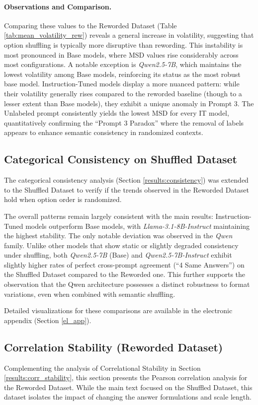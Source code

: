 \paragraph{Observations and Comparison.}
Comparing these values to the Reworded Dataset (Table \ref{tab:mean_volatility_rew}) reveals a general increase in volatility, suggesting that option shuffling is typically more disruptive than rewording. This instability is most pronounced in Base models, where MSD values rise considerably across most configurations. A notable exception is \textit{Qwen2.5-7B}, which maintains the lowest volatility among Base models, reinforcing its status as the most robust base model. Instruction-Tuned models display a more nuanced pattern: while their volatility generally rises compared to the reworded baseline (though to a lesser extent than Base models), they exhibit a unique anomaly in Prompt 3. The Unlabeled prompt consistently yields the lowest MSD for every IT model, quantitatively confirming the ``Prompt 3 Paradox'' where the removal of labels appears to enhance semantic consistency in randomized contexts.


\subsection{Categorical Consistency on Shuffled Dataset}
\label{app:consistency_shuffled}
The categorical consistency analysis (Section \ref{results:consistency}) was extended to the Shuffled Dataset to verify if the trends observed in the Reworded Dataset hold when option order is randomized.

The overall patterns remain largely consistent with the main results: Instruction-Tuned models outperform Base models, with \textit{Llama-3.1-8B-Instruct} maintaining the highest stability. The only notable deviation was observed in the \textit{Qwen} family. Unlike other models that show static or slightly degraded consistency under shuffling, both \textit{Qwen2.5-7B} (Base) and \textit{Qwen2.5-7B-Instruct} exhibit slightly higher rates of perfect cross-prompt agreement (``4 Same Answers'') on the Shuffled Dataset compared to the Reworded one. This further supports the observation that the Qwen architecture possesses a distinct robustness to format variations, even when combined with semantic shuffling.

Detailed visualizations for these comparisons are available in the electronic appendix (Section \ref{el_app}).


\subsection{Correlation Stability (Reworded Dataset)}
\label{app:corr_reworded}
Complementing the analysis of Correlational Stability in Section \ref{results:corr_stability}, this section presents the Pearson correlation analysis for the Reworded Dataset. While the main text focused on the Shuffled Dataset, this dataset isolates the impact of changing the answer formulations and scale length.

